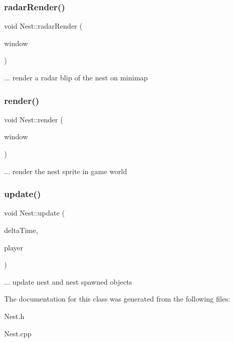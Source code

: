 \subsubsection{\texorpdfstring{radar\+Render()}{radarRender()}}
{\footnotesize\ttfamily void Nest\+::radar\+Render (\begin{DoxyParamCaption}\item[{sf\+::\+Render\+Window \&}]{window }\end{DoxyParamCaption})}

... render a radar blip of the nest on minimap\mbox{\label{class_nest_a09d907a3d411da0249c7d0bb5ad7b36c}} 
\subsubsection{\texorpdfstring{render()}{render()}}
{\footnotesize\ttfamily void Nest\+::render (\begin{DoxyParamCaption}\item[{sf\+::\+Render\+Window \&}]{window }\end{DoxyParamCaption})}

... render the nest sprite in game world\mbox{\label{class_nest_a8f402fb76539074b694158a47aafe002}} 
\subsubsection{\texorpdfstring{update()}{update()}}
{\footnotesize\ttfamily void Nest\+::update (\begin{DoxyParamCaption}\item[{float}]{delta\+Time,  }\item[{\mbox{\hyperlink{class_player}{Player}} $\ast$}]{player }\end{DoxyParamCaption})}

... update nest and nest spawned objects

The documentation for this class was generated from the following files\+:\begin{DoxyCompactItemize}
\item 
Nest.\+h\item 
Nest.\+cpp\end{DoxyCompactItemize}
